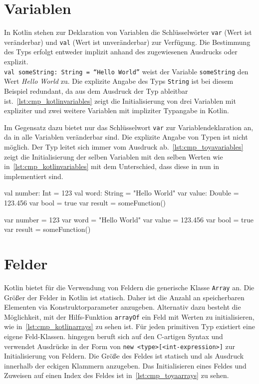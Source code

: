 \section{Variablen}

In Kotlin stehen zur Deklaration von Variablen die Schlüsselwörter \texttt{var} (Wert ist veränderbar) und \texttt{val} (Wert ist unveränderbar) zur Verfügung. Die Bestimmung des Typs erfolgt entweder implizit anhand des zugewiesenen Ausdrucks oder explizit.\\ \texttt{val someString: String = ``Hello World''} weist der Variable \texttt{someString} den Wert \textit{Hello World} zu. Die explizite Angabe des Typs \texttt{String} ist bei diesem Beispiel redundant, da aus dem Ausdruck der Typ ableitbar ist.~\autoref{lst:cmp_kotlinvariables} zeigt die Initialisierung von drei Variablen mit expliziter und zwei weitere Variablen mit impliziter Typangabe in Kotlin.

Im Gegensatz dazu bietet \toya nur das Schlüsselwort \texttt{var} zur Variablendeklaration an, da in \toya alle Variablen veränderbar sind. Die explizite Angabe von Typen ist nicht möglich. Der Typ leitet sich immer vom Ausdruck ab.~\autoref{lst:cmp_toyavariables} zeigt die Initialisierung der selben Variablen mit den selben Werten wie in~\autoref{lst:cmp_kotlinvariables} mit dem Unterschied, dass diese in nun in \toya implementiert sind.

\begin{KotlinCode}[numbers=none, caption={Variablendeklarationen in Kotlin}, label=lst:cmp_kotlinvariables]
val number: Int = 123
val word: String = "Hello World"
var value: Double = 123.456
var bool = true
var result = someFunction()
\end{KotlinCode}

\begin{ToyaCode}[numbers=none, caption={Variablendeklarationen in \toya}, label=lst:cmp_toyavariables]
var number = 123
var word = "Hello World"
var value = 123.456
var bool = true
var result = someFunction()
\end{ToyaCode}

\section{Felder}

Kotlin bietet für die Verwendung von Feldern die generische Klasse \texttt{Array} an. Die Größer der Felder in Kotlin ist statisch. Daher ist die Anzahl an speicherbaren Elementen via Konstruktorparameter anzugeben. Alternativ dazu besteht die Möglichkeit, mit der Hilfs-Funktion \texttt{arrayOf} ein Feld mit Werten zu initialisieren, wie in~\autoref{lst:cmp_kotlinarrays} zu sehen ist. Für jeden primitiven Typ existiert eine eigene Feld-Klassen. \Toya hingegen beruft sich auf den C-artigen Syntax und verwendet Ausdrücke in der Form von \texttt{new <type>[<int-expression>]} zur Initialisierung von Feldern. Die Größe des Feldes ist statisch und als Ausdruck innerhalb der eckigen Klammern anzugeben. Das Initialisieren eines Feldes und Zuweisen auf einen Index des Feldes ist in~\autoref{lst:cmp_toyaarrays} zu sehen.

